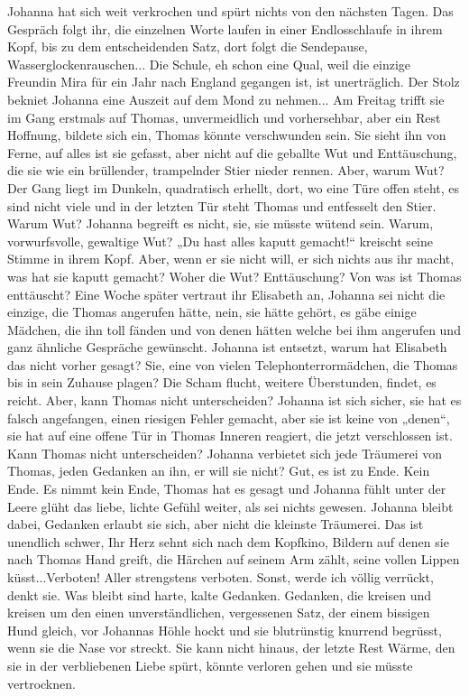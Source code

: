 Johanna hat sich weit verkrochen und spürt nichts von den nächsten Tagen. Das Gespräch folgt ihr, die einzelnen Worte laufen in einer Endlosschlaufe in ihrem Kopf, bis zu dem entscheidenden Satz, dort folgt die Sendepause, Wasserglockenrauschen...
Die Schule, eh schon eine Qual, weil die einzige Freundin Mira für ein Jahr nach England gegangen ist, ist unerträglich. Der Stolz bekniet Johanna eine Auszeit auf dem Mond zu nehmen...
Am Freitag trifft sie im Gang erstmals auf Thomas, unvermeidlich und vorhersehbar, aber ein Rest Hoffnung, bildete sich ein, Thomas könnte verschwunden sein. Sie sieht ihn von Ferne, auf alles ist sie gefasst, aber nicht auf die geballte Wut und Enttäuschung, die sie wie ein brüllender, trampelnder Stier nieder rennen. 
Aber, warum Wut? Der Gang liegt im Dunkeln, quadratisch erhellt, dort, wo eine Türe offen steht, es  sind nicht viele und in der letzten Tür steht Thomas und entfesselt den Stier. Warum Wut? Johanna begreift es nicht, sie, sie müsste wütend sein. Warum, vorwurfsvolle, gewaltige Wut? „Du hast alles kaputt gemacht!“ kreischt seine Stimme in ihrem Kopf. Aber, wenn er sie nicht will, er sich nichts aus ihr macht, was hat sie kaputt gemacht? Woher die Wut? Enttäuschung? Von was ist Thomas enttäuscht?
Eine Woche später vertraut ihr Elisabeth an, Johanna sei nicht die einzige, die Thomas angerufen hätte, nein, sie hätte gehört, es gäbe einige Mädchen, die ihn toll fänden und von denen hätten welche bei ihm angerufen und ganz ähnliche Gespräche gewünscht. Johanna ist entsetzt, warum hat Elisabeth das nicht vorher gesagt? Sie, eine von vielen Telephonterrormädchen, die Thomas bis in sein Zuhause plagen? Die Scham flucht, weitere Überstunden, findet, es reicht. Aber, kann Thomas nicht unterscheiden? Johanna ist sich sicher, sie hat es falsch angefangen, einen riesigen Fehler gemacht, aber sie ist keine von „denen“, sie hat auf eine offene Tür in Thomas Inneren reagiert, die jetzt verschlossen ist. Kann Thomas nicht unterscheiden?
Johanna verbietet sich jede Träumerei von Thomas, jeden Gedanken an ihn, er will sie nicht? Gut, es ist zu Ende.
Kein Ende. Es nimmt kein Ende, Thomas hat es gesagt und Johanna fühlt unter der Leere glüht das liebe, lichte Gefühl weiter, als sei nichts gewesen. Johanna bleibt dabei, Gedanken erlaubt sie sich, aber nicht die kleinste Träumerei. Das ist unendlich schwer, Ihr Herz sehnt sich nach dem Kopfkino, Bildern auf denen sie nach Thomas Hand greift, die Härchen auf seinem Arm zählt, seine vollen Lippen küsst...Verboten! Aller strengstens verboten. Sonst, werde ich völlig verrückt, denkt sie.
Was bleibt sind harte, kalte Gedanken. Gedanken, die kreisen und kreisen um den einen unverständlichen, vergessenen Satz, der einem bissigen Hund gleich, vor Johannas Höhle hockt und sie blutrünstig knurrend begrüsst, wenn sie die Nase vor streckt. Sie kann nicht hinaus, der letzte Rest Wärme, den sie in der verbliebenen Liebe spürt, könnte verloren gehen und sie müsste vertrocknen.
